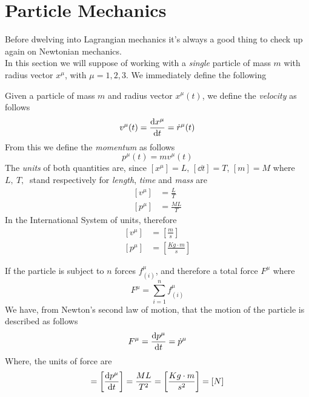 \documentclass[../admech.tex]{subfiles}
\begin{document}
\section{Particle Mechanics}
Before dwelving into Lagrangian mechanics it's always a good thing to check up again on Newtonian mechanics.\\
In this section we will suppose of working with a \emph{single} particle of mass $m$ with radius vector $x^\mu$, with $\mu=1,2,3$. We immediately define the following
\begin{dfn}
	Given a particle of mass $m$ and radius vector $x^\mu(t)$, we define the \emph{velocity} as follows
	\begin{equation}
		v^\mu(t)=\derivative{x^\mu}{t}=\dot{r}^\mu(t)
		\label{eq:velocity}
	\end{equation}
	From this we define the \emph{momentum} as follows
	\begin{equation}
		p^\mu(t)=mv^\mu(t)
		\label{eq:momentum}
	\end{equation}
	The \emph{units} of both quantities are, since $[x^\mu]=L$, $[\dd{t}]=T$, $[m]=M$ where $L,\ T,\ $ stand respectively for \emph{length}, \emph{time} and \emph{mass} are
	\begin{equation*}
		\begin{aligned}
			[v^\mu]&=\frac{L}{T}\\
			[p^\mu]&=\frac{ML}{T}
		\end{aligned}
	\end{equation*}
	In the International System of units, therefore
	\begin{equation*}
		\begin{aligned}
			[v^\mu]&=\left[\frac{m}{s}\right]\\
			[p^\mu]&=\left[\frac{Kg\cdot m}{s}\right]
		\end{aligned}
	\end{equation*}
\end{dfn}
If the particle is subject to $n$ forces $f_{(i)}^\mu$, and therefore a total force $F^\mu$ where
\begin{equation*}
	F^\mu=\sum_{i=1}^n f^\mu_{(i)}
\end{equation*}
We have, from Newton's second law of motion, that the motion of the particle is described as follows
\begin{equation}
	F^\mu=\derivative{p^\mu}{t}=\dot{p}^\mu
	\label{eq:newton2law}
\end{equation}
Where, the units of force are
\begin{equation*}
	[F^\mu]=\left[ \dv{p^\mu}{t} \right]=\frac{ML}{T^2}=\left[\frac{Kg\cdot m}{s^2}\right]=[N]
\end{equation*}
\end{document}
